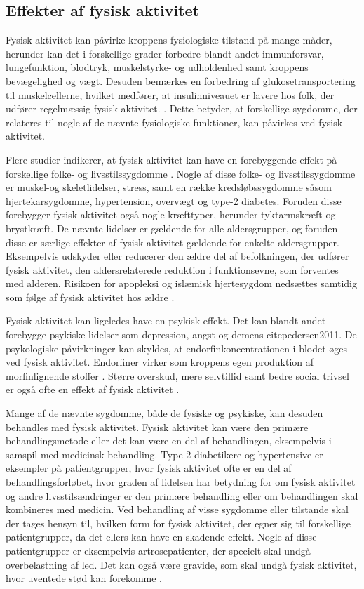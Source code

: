 \subsection{Effekter af fysisk aktivitet}
Fysisk aktivitet kan påvirke kroppens fysiologiske tilstand på mange måder, herunder kan det i forskellige grader forbedre blandt andet immunforsvar, lungefunktion, blodtryk, muskelstyrke- og udholdenhed samt kroppens bevægelighed og vægt. Desuden bemærkes en forbedring af glukosetransportering til muskelcellerne, hvilket medfører, at insulinniveauet er lavere hos folk, der udfører regelmæssig fysisk aktivitet. \citep{andersen2001, martini2015}. Dette betyder, at forskellige sygdomme, der relateres til nogle af de nævnte fysiologiske funktioner, kan påvirkes ved fysisk aktivitet.

Flere studier indikerer, at fysisk aktivitet kan have en forebyggende effekt på forskellige folke- og livsstilssygdomme \citep{warburton2010}. Nogle af disse folke- og livsstilssygdomme er muskel-og skeletlidelser, stress, samt en række kredsløbssygdomme såsom hjertekarsygdomme, hypertension, overvægt og type-2 diabetes. Foruden disse forebygger fysisk aktivitet også nogle kræfttyper, herunder tyktarmskræft og brystkræft. De nævnte lidelser er gældende for alle aldersgrupper, og foruden disse er særlige effekter af fysisk aktivitet gældende for enkelte aldersgrupper. Eksempelvis udskyder eller reducerer den ældre del af befolkningen, der udfører fysisk aktivitet, den aldersrelaterede reduktion i funktionsevne, som forventes med alderen. Risikoen for apopleksi og islæmisk hjertesygdom nedsættes samtidig som følge af fysisk aktivitet hos ældre \citep{pedersen2011,
warburton2010}. 

Fysisk aktivitet kan ligeledes have en psykisk effekt. Det kan blandt andet forebygge psykiske lidelser som depression, angst og demens cite{pedersen2011}. De psykologiske påvirkninger kan skyldes, at endorfinkoncentrationen i blodet øges ved fysisk aktivitet. Endorfiner virker som kroppens egen produktion af morfinlignende stoffer \citep{kessing2016}. Større overskud, mere selvtillid samt bedre social trivsel er også ofte en effekt af fysisk aktivitet \citep{sundhedsstyrelsen2006}. 

Mange af de nævnte sygdomme, både de fysiske og psykiske, kan desuden behandles med fysisk aktivitet. Fysisk aktivitet kan være den primære behandlingsmetode eller det kan være en del af behandlingen, eksempelvis i samspil med medicinsk behandling. Type-2 diabetikere og hypertensive er eksempler på patientgrupper, hvor fysisk aktivitet ofte er en del af behandlingsforløbet, hvor graden af lidelsen har betydning for om fysisk aktivitet og andre livsstilsændringer er den primære behandling eller om behandlingen skal kombineres med medicin. Ved behandling af visse sygdomme eller tilstande skal der tages hensyn til, hvilken form for fysisk aktivitet, der egner sig til forskellige patientgrupper, da det ellers kan have en skadende effekt. Nogle af disse patientgrupper er eksempelvis artrosepatienter, der specielt skal undgå overbelastning af led. Det kan også være gravide, som skal undgå fysisk aktivitet, hvor uventede stød kan forekomme \citep{andersen2001, pedersen2011}.
